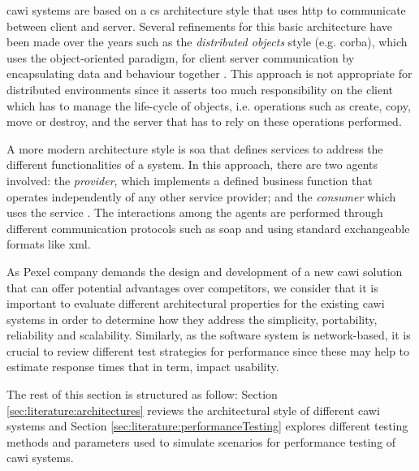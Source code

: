 	\gls{cawi} systems are based on a \gls{cs} architecture style that uses \gls{http} to communicate between client and server. Several refinements for this basic architecture have been made over the years such as the \emph{distributed objects} style (e.g. \gls{corba}), which uses the object-oriented paradigm, for client server communication by encapsulating data and behaviour together \cite{proc:overdick07}. This approach is not appropriate for distributed environments since it asserts too much responsibility on the client which has to manage the life-cycle of objects, i.e. operations such as create, copy, move or destroy, and the server that has to rely on these operations performed.

	A more modern architecture style is \gls{soa} that defines services to address the different functionalities of a system. In this approach, there are two agents involved: the \emph{provider}, which implements a defined business function that operates independently of any other service provider; and the \emph{consumer} which uses the service \cite{tech:mackenzie06}. The interactions among the agents are performed through different communication protocols such as \gls{soap} and using standard exchangeable formats like \gls{xml}.

	As Pexel company demands the design and development of a new \gls{cawi} solution that can offer potential advantages over competitors, we consider that it is important to evaluate different architectural properties for the existing \gls{cawi} systems in order to determine how they address the simplicity, portability, reliability and scalability. Similarly, as the software system is network-based, it is crucial to review different test strategies for performance since these may help to estimate response times that in term, impact usability.

	The rest of this section is structured as follow: Section \ref{sec:literature:architectures} reviews the architectural style of different \gls{cawi} systems and Section \ref{sec:literature:performanceTesting} explores different testing methods and parameters used to simulate scenarios for performance testing of \gls{cawi} systems.




